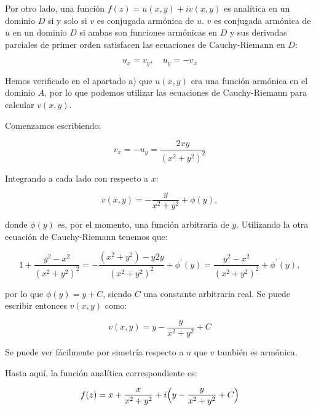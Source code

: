 \begin{enumerate}
    Por otro lado, una función $f(z) = u(x,y) + iv(x,y)$ es analítica en un dominio $D$ si y solo si $v$ es conjugada
    armónica de $u$. $v$ es conjugada armónica de $u$ en un dominio $D$
    si ambas son funciones armónicas en $D$ y sus derivadas parciales de primer orden
    satisfacen las ecuaciones de Cauchy-Riemann en $D$:

    \begin{equation*}
        u_x = v_y,\hspace{12pt} u_y = -v_x
    \end{equation*}

    Hemos verificado en el apartado a) que $u(x,y)$ era una función armónica en el dominio $A$, por lo que podemos utilizar las ecuaciones de
    Cauchy-Riemann para calcular $v(x,y)$.

    Comenzamos escribiendo:

    \begin{equation*}
       v_x = -u_y = \frac{2xy}{(x^2+ y^2)^2}
    \end{equation*}

    Integrando a cada lado con respecto a $x$:

    \begin{equation*}
        v(x,y) = - \frac{y}{x^2 + y^2} + \phi(y),
    \end{equation*}

    donde $\phi(y)$ es, por el momento, una función arbitraria de $y$. Utilizando la otra ecuación de Cauchy-Riemann tenemos que:

    \begin{equation*}
        1 + \frac{y^2 - x^2}{(x^2+y^2)^2} = - \frac{(x^2+y^2)-y2y}{(x^2+y^2)^2} + \phi^{\prime}(y) = \frac{y^2 - x^2}{(x^2+y^2)^2} + \phi^{\prime}(y),
    \end{equation*}

    por lo que $\phi(y) = y + C$, siendo $C$ una constante arbitraria real. Se puede escribir entonces $v(x,y)$ como:

    \begin{equation*}
       v(x,y) = y - \frac{y}{x^2+y^2} + C
    \end{equation*}

    Se puede ver fácilmente por simetría respecto a $u$ que $v$ también es armónica.

    Hasta aquí, la función analítica correspondiente es:

    \begin{equation*}
        f(z) = x + \frac{x}{x^2+y^2} + i \Bigl(y - \frac{y}{x^2+y^2} + C\Bigr)
    \end{equation*}


\end{enumerate}
